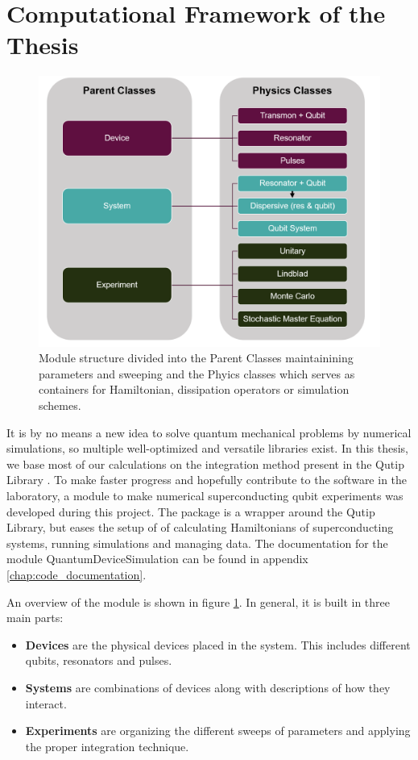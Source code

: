 \section{Computational Framework of the Thesis}
\begin{figure}[b]
    \centering
    \includegraphics[width = 0.80 \textwidth]{Figs/Sections/Introduction/module_v2.png}
    \caption{Module structure divided into the Parent Classes maintainining parameters and sweeping and the Phyics classes which serves as containers for Hamiltonian, dissipation operators or simulation schemes.}
    \label{fig:module_overview}
\end{figure}
It is by no means a new idea to solve quantum mechanical problems by numerical simulations, so multiple well-optimized and versatile libraries exist. In this thesis, we base most of our calculations on the integration method present in the Qutip Library \cite{johansson_qutip_2012}. To make faster progress and hopefully contribute to the software in the laboratory, a module to make numerical superconducting qubit experiments was developed during this project. The package is a wrapper around the Qutip Library, but eases the setup of of calculating Hamiltonians of superconducting systems, running simulations and managing data. The documentation for the module QuantumDeviceSimulation can be found in appendix \ref{chap:code_documentation}.

An overview of the module is shown in figure \ref{fig:module_overview}. In general, it is built in three main parts:
\begin{itemize}
    \item \textbf{Devices} are the physical devices placed in the system. This includes different qubits, resonators and pulses.
    \item \textbf{Systems} are combinations of devices along with descriptions of how they interact.
    \item \textbf{Experiments} are organizing the different sweeps of parameters and applying the proper integration technique. 
\end{itemize}